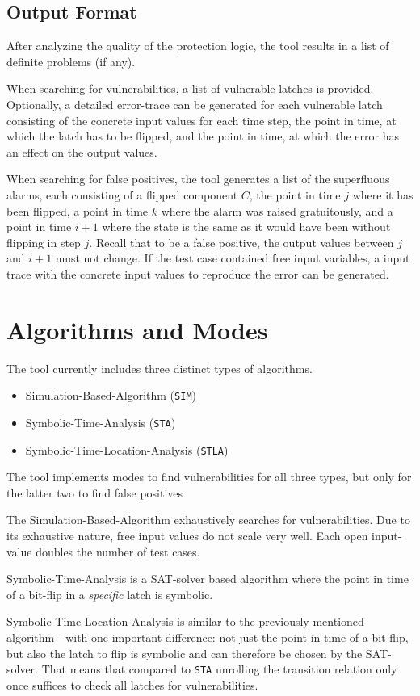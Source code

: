 \documentclass[a4paper,10pt]{article}
\begin{document}
\subsection{Output Format}
After analyzing the quality of the protection logic, the tool results in a list of definite problems (if any).

When searching for vulnerabilities, a list of vulnerable latches is provided. Optionally, a detailed error-trace can be generated
for each vulnerable latch consisting of the concrete input values for each time step, the point in time, at which the latch has to be flipped,
and the point in time, at which the error has an effect on the output values.

When searching for false positives, the tool generates a list of the superfluous alarms, each consisting of a flipped component $C$,
the point in time $j$ where it has been flipped, a point in time $k$ where the alarm was raised gratuitously, and a point in time $i+1$ where 
the state is the same as it would have been without flipping in step $j$. Recall that to be a false positive, the output values between $j$ and $i+1$ must not change.
If the test case contained free input variables, a input trace with the concrete input values to reproduce the error can be generated.
\newpage
\section{Algorithms and Modes} \label{algorithms}
The tool currently includes three distinct types of algorithms.
\begin{itemize}
 \item Simulation-Based-Algorithm (\texttt{SIM})
 \item Symbolic-Time-Analysis (\texttt{STA})
 \item Symbolic-Time-Location-Analysis (\texttt{STLA})
\end{itemize}
The tool implements modes to find vulnerabilities for all three types, but only for the latter two to find false positives

The Simulation-Based-Algorithm exhaustively searches for vulnerabilities. Due to its exhaustive nature, free input values do not scale very well. Each open input-value doubles the number of
test cases.

Symbolic-Time-Analysis is a SAT-solver based algorithm where the point in time of a bit-flip in a \emph{specific} latch is symbolic.

Symbolic-Time-Location-Analysis is similar to the previously mentioned algorithm - with one important difference: not just the point in time of a bit-flip, but also the latch to flip is symbolic and can therefore be chosen
by the SAT-solver. That means that compared to \texttt{STA} unrolling the transition relation only once suffices to check all latches for vulnerabilities.
\end{document}
